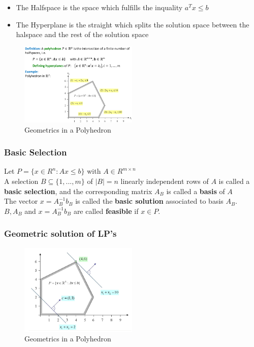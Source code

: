 \begin{itemize}
    \item The Halfspace is the space which fulfills the inquality $a^Tx \leq b$
    \item The Hyperplane is the straight which splits the solution space between the halspace and the rest of the solution space
\end{itemize}

\begin{figure}[H]
\centering
\includegraphics[width=0.5\textwidth]{figures/polyhedron.png}
\caption{Geometrics in a Polyhedron}
\end{figure}

\subsubsection{Basic Selection}
Let $P = \{x \in R^n:Ax \leq b\}$ with $A \in R^{m \times n}$ \\
A selection $B \subseteq \{1, ..., m\}$ of $|B| = n$ linearly independent rows of $A$ is called a \textbf{basic selection}, and the corresponding matrix $A_B$ is called a \textbf{basis} of $A$ \\
The vector $x = A_{B}^{-1} b_B$ is called the \textbf{basic solution} associated to basis $A_B$. \\
$B, A_B$ and $x = A_{B}^{-1} b_B$ are called \textbf{feasible} if $x \in P$.

\subsubsection{Geometric solution of LP's}

\begin{figure}[H]
\centering
\includegraphics[width=0.5\textwidth]{figures/geometricLP.png}
\caption{Geometrics in a Polyhedron}
\end{figure}

